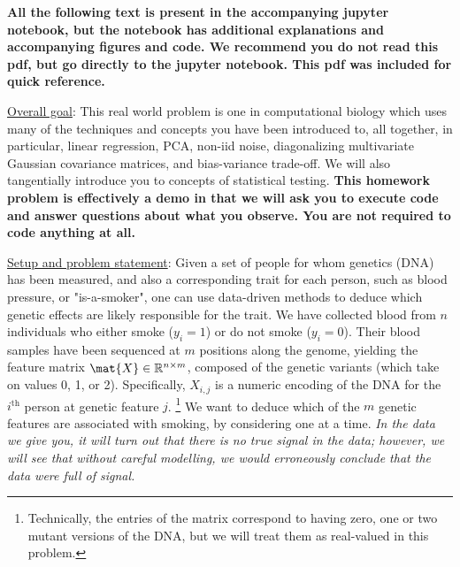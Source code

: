 \documentclass[preview]{standalone}
\begin{document}

\textbf{All the following text is present in the accompanying jupyter notebook, but the notebook has additional explanations and accompanying figures and code. We recommend you do not read this pdf, but go directly to the jupyter notebook. This pdf was included for quick reference.}

\underline{Overall goal}: This real world problem is one in computational biology which uses many of the techniques and concepts you have been introduced to, all together, in particular, linear regression, PCA, non-iid noise, diagonalizing multivariate Gaussian covariance matrices, and bias-variance trade-off. We will also tangentially introduce you to concepts of statistical testing. \textbf{This homework problem is effectively a demo in that we will ask you to execute code and answer questions about what you observe. You are not required to code anything at all.}


\underline{Setup and problem statement}: Given a set of people for whom genetics (DNA) has been measured, and also a corresponding trait for each person, such as blood pressure, or "is-a-smoker", one can use data-driven methods to deduce which genetic effects are likely responsible for the trait. We have collected blood from $n$ individuals who either smoke ($y_i=1$) or do not smoke ($y_i=0$). Their blood samples have been sequenced at $m$ positions along the genome, yielding the feature matrix $\mat{X} \in\mathbb{R}^{n \times m}$, composed of the genetic variants (which take on values 0, 1, or 2). Specifically, $X_{i,j}$ is a numeric encoding of the DNA for the $i^{\text{th}}$ person at genetic feature $j$. \footnote{Technically, the entries of the matrix correspond to having zero, one or two mutant versions of the DNA, but we will treat them as real-valued in this problem.} We want to deduce which of the $m$ genetic features are associated with smoking, by considering one at a time. \textit{In the data we give you, it will turn out that there is no true signal in the data; however, we will see that without careful modelling, we would erroneously conclude that the data were full of signal.}
\end{document}
